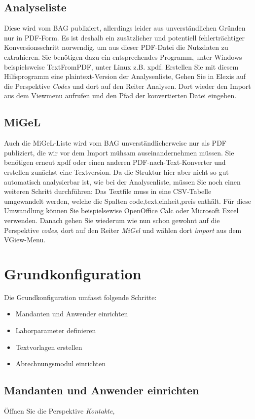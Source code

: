 \subsection{Analyseliste}
Diese wird vom BAG publiziert, allerdings leider aus unverständlichen Gründen nur in PDF-Form. Es ist deshalb ein zusätzlicher und potentiell fehlerträchtiger Konversionsschritt norwendig, um aus dieser PDF-Datei die Nutzdaten zu extrahieren. Sie benötigen dazu ein entsprechendes Programm, unter Windows beispielsweise TextFromPDF, unter Linux z.B. xpdf. Erstellen Sie mit diesem Hilfsprogramm eine plaintext-Version der Analysenliste, Gehen Sie in Elexis auf die Perspektive \textit{Codes} und dort auf den Reiter Analysen. Dort wieder den Import aus dem Viewmenu aufrufen und den Pfad der konvertierten Datei eingeben.
\subsection{MiGeL}
Auch die MiGeL-Liste wird vom BAG unverständlicherweise nur als PDF publiziert, die wir vor dem Import mühsam auseinandernehmen müssen. Sie benötigen erneut xpdf oder einen anderen PDF-nach-Text-Konverter und erstellen zunächst eine Textversion. Da die Struktur hier aber nicht so gut automatisch analysierbar ist, wie bei der Analysenliste, müssen Sie noch einen weiteren Schritt durchführen: Das Textfile muss in eine CSV-Tabelle umgewandelt werden, welche die Spalten code,text,einheit,preis enthält. Für diese Umwandlung können Sie beispielsewise OpenOffice Calc oder Microsoft Excel verwenden. Danach gehen Sie wiederum wie nun schon gewohnt auf die Perspektive \textit{codes}, dort auf den Reiter \textit{MiGel} und wählen dort \textit{import} aus dem VGiew-Menu.

\section{Grundkonfiguration}
\label{grundkonfiguration}
Die Grundkonfiguration umfasst folgende Schritte:
\begin{itemize}
  \item Mandanten und Anwender einrichten
  \item Laborparameter definieren
  \item Textvorlagen erstellen
  \item Abrechnungsmodul einrichten
\end{itemize}
\subsection{Mandanten und Anwender einrichten}
Öffnen Sie die Perspektive \textit{Kontakte},

